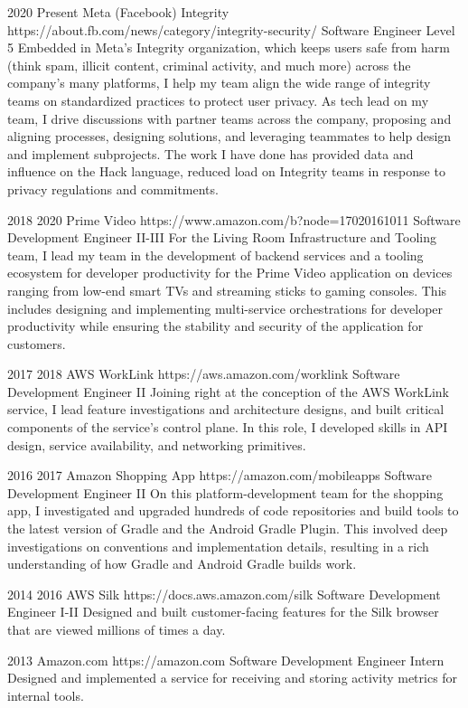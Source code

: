 \job
{2020} {Present}
{Meta (Facebook) Integrity} {https://about.fb.com/news/category/integrity-security/}
{Software Engineer Level 5}
{
    Embedded in Meta's Integrity organization, which keeps users safe from harm (think spam, illicit content, criminal activity, and much more) across the company's many platforms, I help my team align the wide range of integrity teams on standardized practices to protect user privacy. As tech lead on my team, I drive discussions with partner teams across the company, proposing and aligning processes, designing solutions, and leveraging teammates to help design and implement subprojects. The work I have done has provided data and influence on the  {Hack language}, reduced load on Integrity teams in response to  {privacy regulations and commitments}.
}

\job
{2018} {2020}
{Prime Video} {https://www.amazon.com/b?node=17020161011}
{Software Development Engineer II-III}
{
    For the Living Room Infrastructure and Tooling team, I lead my team in the development of backend services and a tooling ecosystem for developer productivity for the Prime Video application on devices ranging from low-end smart TVs and streaming sticks to gaming consoles. This includes designing and implementing multi-service orchestrations for developer productivity while ensuring the stability and security of the application for customers.
}

\job
{2017} {2018}
{AWS WorkLink} {https://aws.amazon.com/worklink}
{Software Development Engineer II}
{
    Joining right at the conception of the AWS WorkLink service, I lead feature investigations and architecture designs, and built critical components of the service's control plane. In this role, I developed skills in API design, service availability, and networking primitives.
}

\job
{2016} {2017}
{Amazon Shopping App} {https://amazon.com/mobileapps}
{Software Development Engineer II}
{
    On this platform-development team for the shopping app, I investigated and upgraded hundreds of code repositories and build tools to the latest version of  {Gradle} and the  {Android Gradle Plugin}. This involved deep investigations on conventions and implementation details, resulting in a rich understanding of how Gradle and Android Gradle builds work.
}

\job
{2014} {2016}
{AWS Silk} {https://docs.aws.amazon.com/silk}
{Software Development Engineer I-II}
{
    Designed and built customer-facing features for the Silk browser that are viewed millions of times a day.
}

\job
{2013} {}
{Amazon.com} {https://amazon.com}
{Software Development Engineer Intern}
{
    Designed and implemented a service for receiving and storing activity metrics for internal tools.
}
